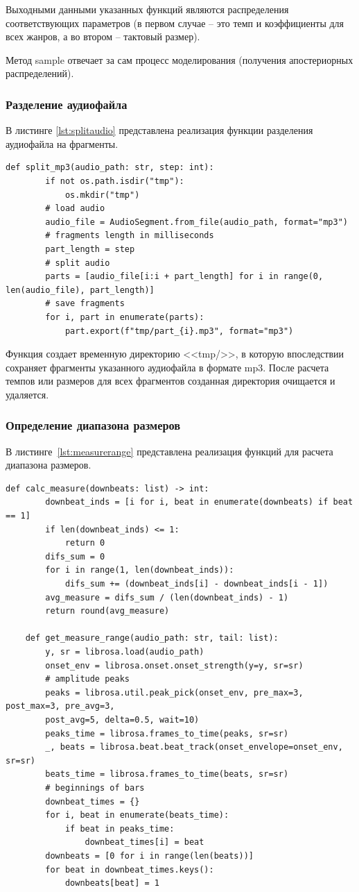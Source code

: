 Выходными данными указанных функций являются распределения соответствующих параметров (в первом случае -- это темп и коэффициенты для всех жанров, а во втором -- тактовый размер).

Метод sample отвечает за сам процесс моделирования (получения апостериорных распределений).

\subsubsection{Разделение аудиофайла}

В листинге \ref{lst:splitaudio} представлена реализация функции разделения аудиофайла на фрагменты.

\begin{lstlisting}[label={lst:splitaudio}, caption={разделение аудиофайла на фрагменты}]
	def split_mp3(audio_path: str, step: int):
		if not os.path.isdir("tmp"):
			os.mkdir("tmp")
		# load audio
		audio_file = AudioSegment.from_file(audio_path, format="mp3")
		# fragments length in milliseconds
		part_length = step
		# split audio
		parts = [audio_file[i:i + part_length] for i in range(0, len(audio_file), part_length)]
		# save fragments
		for i, part in enumerate(parts):
			part.export(f"tmp/part_{i}.mp3", format="mp3")
\end{lstlisting}

Функция создает временную директорию <<tmp/>>, в которую впоследствии сохраняет фрагменты указанного аудиофайла в формате mp3. После расчета темпов или размеров для всех фрагментов созданная директория очищается и удаляется.

\subsubsection{Определение диапазона размеров}

В листинге~\ref{lst:measurerange} представлена реализация функций для расчета диапазона размеров.

\begin{lstlisting}[label={lst:measurerange}, caption={определение диапазона размеров}]
	def calc_measure(downbeats: list) -> int:
		downbeat_inds = [i for i, beat in enumerate(downbeats) if beat == 1]
		if len(downbeat_inds) <= 1:
			return 0
		difs_sum = 0
		for i in range(1, len(downbeat_inds)):
			difs_sum += (downbeat_inds[i] - downbeat_inds[i - 1])
		avg_measure = difs_sum / (len(downbeat_inds) - 1)
		return round(avg_measure)
	
	def get_measure_range(audio_path: str, tail: list):
		y, sr = librosa.load(audio_path)
		onset_env = librosa.onset.onset_strength(y=y, sr=sr)
		# amplitude peaks
		peaks = librosa.util.peak_pick(onset_env, pre_max=3, post_max=3, pre_avg=3,
		post_avg=5, delta=0.5, wait=10)
		peaks_time = librosa.frames_to_time(peaks, sr=sr)
		_, beats = librosa.beat.beat_track(onset_envelope=onset_env, sr=sr)
		beats_time = librosa.frames_to_time(beats, sr=sr)
		# beginnings of bars
		downbeat_times = {}
		for i, beat in enumerate(beats_time):
			if beat in peaks_time:
				downbeat_times[i] = beat
		downbeats = [0 for i in range(len(beats))]
		for beat in downbeat_times.keys():
			downbeats[beat] = 1
\end{lstlisting}


